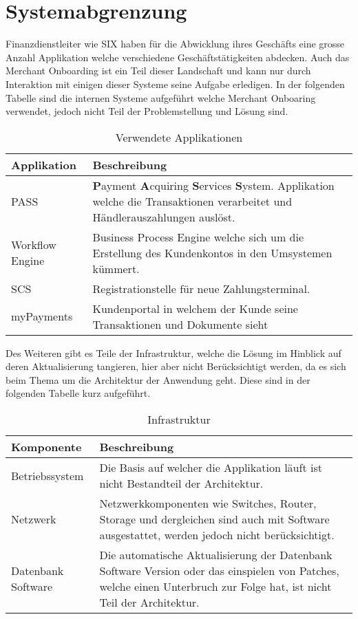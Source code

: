 \section{Systemabgrenzung}
\label{Abgrenzung}

Finanzdienstleiter wie SIX haben für die Abwicklung ihres Geschäfts eine grosse Anzahl Applikation welche verschiedene Geschäftstätigkeiten abdecken. Auch das Merchant Onboarding ist ein Teil dieser Landschaft und kann nur durch Interaktion mit einigen dieser Systeme seine Aufgabe erledigen. In der folgenden Tabelle sind die internen Systeme aufgeführt welche Merchant Onboaring verwendet, jedoch nicht Teil der Problemstellung und Lösung sind.
\begin{table}[H]
	\centering
	\caption{Verwendete Applikationen}
	\begin{tabular}{ | p{3cm} | p{11cm} | }
		\toprule
		{\textbf{Applikation}} & {\textbf{Beschreibung}} \\
		\midrule
		PASS & \textbf{P}ayment \textbf{A}cquiring \textbf{S}ervices \textbf{S}ystem. Applikation welche die Transaktionen verarbeitet und Händlerauszahlungen auslöst. \\ \hline
		Workflow Engine & Business Process Engine welche sich um die Erstellung des Kundenkontos in den Umsystemen kümmert.\\ \hline
		SCS & Registrationstelle für neue Zahlungsterminal.\\ \hline
		myPayments & Kundenportal in welchem der Kunde seine Transaktionen und Dokumente sieht \\
		\bottomrule
	\end{tabular}
\end{table}
Des Weiteren gibt es Teile der Infrastruktur, welche die Lösung im Hinblick auf deren Aktualisierung tangieren, hier aber nicht Berücksichtigt werden, da es sich beim Thema um die Architektur der Anwendung geht. Diese sind in der folgenden Tabelle kurz aufgeführt.

\begin{table}[H]
	\centering
	\caption{Infrastruktur}
	\begin{tabular}{ | p{3cm} | p{11cm} | }
		\toprule
		{\textbf{Komponente}} & {\textbf{Beschreibung}} \\
		\midrule
		Betriebssystem & Die Basis auf welcher die Applikation läuft ist nicht Bestandteil der Architektur. \\ \hline
		Netzwerk & Netzwerkkomponenten wie Switches, Router, Storage und dergleichen sind auch mit Software ausgestattet, werden jedoch nicht berücksichtigt.\\ \hline
		Datenbank Software & Die automatische Aktualisierung der Datenbank Software Version oder das einspielen von Patches, welche einen Unterbruch zur Folge hat, ist nicht Teil der Architektur. \\
		\bottomrule
	\end{tabular}
\end{table}

